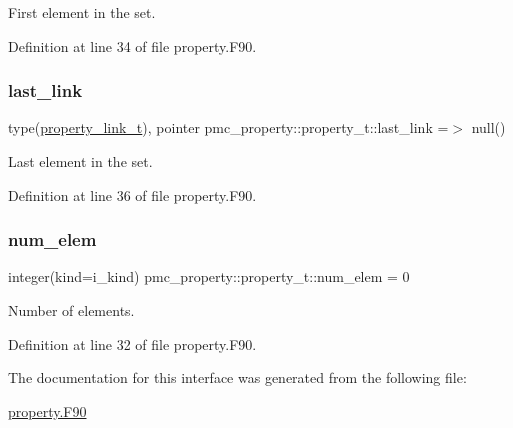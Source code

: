 First element in the set. 



Definition at line 34 of file property.\+F90.

\mbox{\label{structpmc__property_1_1property__t_abfc2553c9fe9be9eae86248ae81f3771}} 
\subsubsection{\texorpdfstring{last\+\_\+link}{last\_link}}
{\footnotesize\ttfamily type(\mbox{\hyperlink{structpmc__property_1_1property__link__t}{property\+\_\+link\+\_\+t}}), pointer pmc\+\_\+property\+::property\+\_\+t\+::last\+\_\+link =$>$ null()\hspace{0.3cm}{\ttfamily [private]}}



Last element in the set. 



Definition at line 36 of file property.\+F90.

\mbox{\label{structpmc__property_1_1property__t_a86c7def7b825d018cb0cb9dc1c5a80aa}} 
\subsubsection{\texorpdfstring{num\+\_\+elem}{num\_elem}}
{\footnotesize\ttfamily integer(kind=i\+\_\+kind) pmc\+\_\+property\+::property\+\_\+t\+::num\+\_\+elem = 0\hspace{0.3cm}{\ttfamily [private]}}



Number of elements. 



Definition at line 32 of file property.\+F90.



The documentation for this interface was generated from the following file\+:\begin{DoxyCompactItemize}
\item 
\mbox{\hyperlink{property_8_f90}{property.\+F90}}\end{DoxyCompactItemize}
